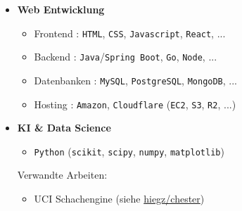 \documentclass[]{article}
\begin{document}
\vspace{5pt}
\begin{minipage}[t]{0.49\linewidth}
    \begin{itemize}[leftmargin=0.15in, rightmargin=0.15in, label={}]
        \item {\large\bfseries Web Entwicklung}

            \begin{itemize}
                \item Frontend : \verb|HTML|, \verb|CSS|, \verb|Javascript|, \verb|React|, ...
                \item Backend : \verb|Java|/\verb|Spring Boot|, \verb|Go|, \verb|Node|, ...
                \item Datenbanken : \verb|MySQL|, \verb|PostgreSQL|, \verb|MongoDB|, ...
                \item Hosting : \verb|Amazon|, \verb|Cloudflare| (\verb|EC2|, \verb|S3|, \verb|R2|, ...)
            \end{itemize}
    \end{itemize}
\end{minipage}
\hspace{10pt}
\begin{minipage}[t]{0.49\linewidth}
    \begin{itemize}[leftmargin=0.15in, rightmargin=0.15in, label={}]
        \item {\large\bfseries KI \& Data Science}
            \begin{itemize}
                \item \verb|Python| (\verb|scikit|, \verb|scipy|, \verb|numpy|, \verb|matplotlib|)
            \end{itemize}
            Verwandte Arbeiten:
            \begin{itemize}
                \item UCI Schachengine (siehe \href{https://github.com/hiegz/chester}{\ttfamily hiegz/chester}) \\[3pt]
            \end{itemize}
    \end{itemize}
\end{minipage}
\\[20pt]
\end{document}
